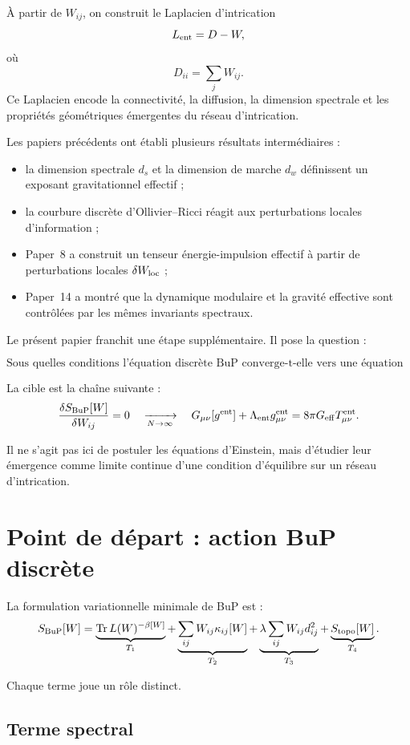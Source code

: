 \documentclass[11pt,a4paper]{article}
\begin{document}
À partir de \(W_{ij}\), on construit le Laplacien d'intrication
\[
L_{\rm ent}=D-W,
\]
où
\[
D_{ii}=\sum_j W_{ij}.
\]
Ce Laplacien encode la connectivité, la diffusion, la dimension spectrale
et les propriétés géométriques émergentes du réseau d'intrication.

Les papiers précédents ont établi plusieurs résultats intermédiaires :
\begin{itemize}
    \item la dimension spectrale \(d_s\) et la dimension de marche \(d_w\)
    définissent un exposant gravitationnel effectif ;
    \item la courbure discrète d'Ollivier--Ricci réagit aux perturbations
    locales d'information ;
    \item Paper~8 a construit un tenseur énergie-impulsion effectif à partir
    de perturbations locales \(\delta W_{\rm loc}\) ;
    \item Paper~14 a montré que la dynamique modulaire et la gravité
    effective sont contrôlées par les mêmes invariants spectraux.
\end{itemize}

Le présent papier franchit une étape supplémentaire. Il pose la question :

\[
\boxed{
\text{Sous quelles conditions l'équation discrète BuP converge-t-elle vers
une équation d'Einstein effective ?}
}
\]

La cible est la chaîne suivante :
\[
\frac{\delta S_{\rm BuP}[W]}{\delta W_{ij}}=0
\quad
\xrightarrow[N\to\infty]{}
\quad
G_{\mu\nu}[g^{\rm ent}]
+
\Lambda_{\rm ent}g_{\mu\nu}^{\rm ent}
=
8\pi G_{\rm eff}T_{\mu\nu}^{\rm ent}.
\]

Il ne s'agit pas ici de postuler les équations d'Einstein, mais d'étudier
leur émergence comme limite continue d'une condition d'équilibre sur un réseau
d'intrication.

\section{Point de départ : action BuP discrète}

La formulation variationnelle minimale de BuP est :
\[
S_{\rm BuP}[W]
=
\underbrace{\mathrm{Tr}\,L(W)^{-\beta[W]}}_{T_1}
+
\underbrace{\sum_{ij}W_{ij}\kappa_{ij}[W]}_{T_2}
+
\underbrace{\lambda\sum_{ij}W_{ij}d_{ij}^{2}}_{T_3}
+
\underbrace{S_{\rm topo}[W]}_{T_4}.
\]

Chaque terme joue un rôle distinct.

\subsection{Terme spectral}
\end{document}
